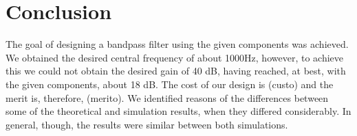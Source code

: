 \section{Conclusion}
\label{sec:conclusion}
The goal of designing a bandpass filter using the given components was achieved. We obtained the desired central frequency of about 1000Hz, however, to achieve this we could not obtain the desired gain
of 40 dB, having reached, at best, with the given components, about 18 dB. The cost of our design is (custo) and the merit is, therefore, (merito). We identified reasons of the differences
between some of the theoretical and simulation results, when they differed considerably. In general, though, the results were similar between both simulations.


